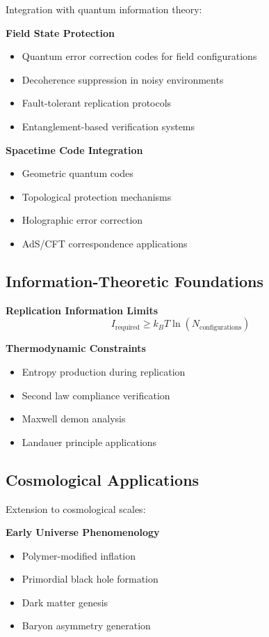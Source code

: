 \documentclass[11pt]{article}
\begin{document}
Integration with quantum information theory:

\textbf{Field State Protection}
\begin{itemize}
\item Quantum error correction codes for field configurations
\item Decoherence suppression in noisy environments
\item Fault-tolerant replication protocols
\item Entanglement-based verification systems
\end{itemize}

\textbf{Spacetime Code Integration}
\begin{itemize}
\item Geometric quantum codes
\item Topological protection mechanisms
\item Holographic error correction
\item AdS/CFT correspondence applications
\end{itemize}

\subsection{Information-Theoretic Foundations}

\textbf{Replication Information Limits}
\begin{equation}
I_{\text{required}} \geq k_B T \ln(N_{\text{configurations}})
\end{equation}

\textbf{Thermodynamic Constraints}
\begin{itemize}
\item Entropy production during replication
\item Second law compliance verification
\item Maxwell demon analysis
\item Landauer principle applications
\end{itemize}

\subsection{Cosmological Applications}

Extension to cosmological scales:

\textbf{Early Universe Phenomenology}
\begin{itemize}
\item Polymer-modified inflation
\item Primordial black hole formation
\item Dark matter genesis
\item Baryon asymmetry generation
\end{itemize}
\end{document}
